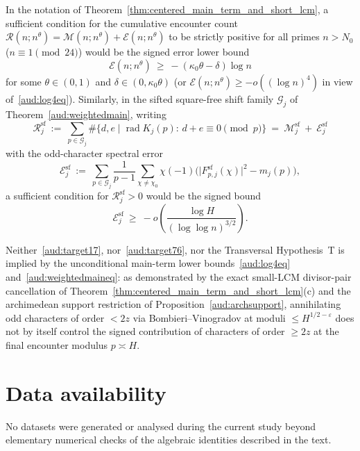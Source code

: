 \documentclass[11pt, a4paper]{article}
\theoremstyle{plain}
\theoremstyle{definition}
\newcommand{\sfm}{\mathrm{sf}}
\DeclareMathOperator{\rad}{rad}
\begin{document}
In the notation of Theorem~\ref{thm:centered_main_term_and_short_lcm}, a sufficient condition for the cumulative encounter count $\mathcal{R}(n;n^{\theta})=\mathcal{M}(n;n^{\theta})+\mathcal{E}(n;n^{\theta})$ to be strictly positive for all primes $n>N_0$ ($n\equiv1\pmod{24}$) would be the signed error lower bound
\begin{equation}\label{aud:target17}
\mathcal{E}(n;n^{\theta})\ \ge\ -(\kappa_0\theta-\delta)\log n \tag{C17}
\end{equation}
for some $\theta\in(0,1)$ and $\delta\in(0,\kappa_0\theta)$ (or $\mathcal{E}(n;n^{\theta})\ge -o((\log n)^{4})$ in view of~\eqref{aud:log4eq}). Similarly, in the sifted square-free shift family $\mathcal{G}_j$ of Theorem~\ref{aud:weightedmain}, writing
\[
\mathcal{R}_j^{\sfm}\ :=\ \sum_{p\in\mathcal{G}_j}\#\big\{d,e\mid\rad K_j(p):\,d+e\equiv0\pmod p\big\}\ =\ \mathcal{M}_j^{\sfm}\ +\ \mathcal{E}_j^{\sfm}
\]
with the odd-character spectral error
\begin{equation}\label{aud:Esf}
\mathcal{E}_j^{\sfm}\ :=\ \sum_{p\in\mathcal{G}_j}\frac{1}{p-1}\sum_{\chi\ne\chi_0}\chi(-1)\Big(\big|F_{p,j}^{\sfm}(\chi)\big|^{2}-m_j(p)\Big),
\end{equation}
a sufficient condition for $\mathcal{R}_j^{\sfm}>0$ would be the signed bound
\begin{equation}\label{aud:target76}
\mathcal{E}_j^{\sfm}\ \ge\ -o\!\left(\frac{\log H}{(\log\log n)^{3/2}}\right). \tag{C76}
\end{equation}

Neither~\eqref{aud:target17}, nor~\eqref{aud:target76}, nor the Transversal Hypothesis~T is implied by the unconditional main-term lower bounds~\eqref{aud:log4eq} and~\eqref{aud:weightedmaineq}: as demonstrated by the exact small-LCM divisor-pair cancellation of Theorem~\ref{thm:centered_main_term_and_short_lcm}(c) and the archimedean support restriction of Proposition~\ref{aud:archsupport}, annihilating odd characters of order $<2z$ via Bombieri--Vinogradov at moduli $\le H^{1/2-\varepsilon}$ does not by itself control the signed contribution of characters of order $\ge 2z$ at the final encounter modulus $p\asymp H$.

\section*{Data availability}
No datasets were generated or analysed during the current study beyond elementary numerical checks of the algebraic identities described in the text.
\end{document}

